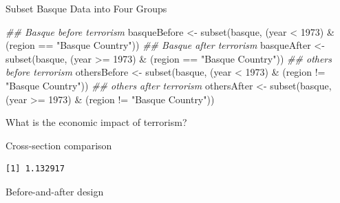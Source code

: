 \documentclass[
  letterpaper,
  DIV=11,
  numbers=noendperiod]{scrreprt}
\newenvironment{Shaded}{\begin{snugshade}}{\end{snugshade}}
\newcommand{\DecValTok}[1]{\textcolor[rgb]{0.68,0.00,0.00}{#1}}
\newcommand{\DocumentationTok}[1]{\textcolor[rgb]{0.37,0.37,0.37}{\textit{#1}}}
\newcommand{\FunctionTok}[1]{\textcolor[rgb]{0.28,0.35,0.67}{#1}}
\newcommand{\NormalTok}[1]{\textcolor[rgb]{0.00,0.23,0.31}{#1}}
\newcommand{\OtherTok}[1]{\textcolor[rgb]{0.00,0.23,0.31}{#1}}
\newcommand{\SpecialCharTok}[1]{\textcolor[rgb]{0.37,0.37,0.37}{#1}}
\newcommand{\StringTok}[1]{\textcolor[rgb]{0.13,0.47,0.30}{#1}}
\begin{document}
Subset Basque Data into Four Groups

\begin{Shaded}
\begin{Highlighting}[]
\DocumentationTok{\#\# Basque before terrorism}
\NormalTok{basqueBefore }\OtherTok{\textless{}{-}} \FunctionTok{subset}\NormalTok{(basque, (year }\SpecialCharTok{\textless{}} \DecValTok{1973}\NormalTok{) }\SpecialCharTok{\&}
\NormalTok{                            (region }\SpecialCharTok{==} \StringTok{"Basque Country"}\NormalTok{))}
\DocumentationTok{\#\# Basque after terrorism}
\NormalTok{basqueAfter }\OtherTok{\textless{}{-}} \FunctionTok{subset}\NormalTok{(basque, (year }\SpecialCharTok{\textgreater{}=} \DecValTok{1973}\NormalTok{) }\SpecialCharTok{\&}
\NormalTok{                           (region }\SpecialCharTok{==} \StringTok{"Basque Country"}\NormalTok{))}
\DocumentationTok{\#\# others before terrorism}
\NormalTok{othersBefore }\OtherTok{\textless{}{-}} \FunctionTok{subset}\NormalTok{(basque, (year }\SpecialCharTok{\textless{}} \DecValTok{1973}\NormalTok{) }\SpecialCharTok{\&}
\NormalTok{                            (region }\SpecialCharTok{!=} \StringTok{"Basque Country"}\NormalTok{))}
\DocumentationTok{\#\# others after terrorism}
\NormalTok{othersAfter }\OtherTok{\textless{}{-}} \FunctionTok{subset}\NormalTok{(basque, (year }\SpecialCharTok{\textgreater{}=} \DecValTok{1973}\NormalTok{) }\SpecialCharTok{\&}
\NormalTok{                           (region }\SpecialCharTok{!=} \StringTok{"Basque Country"}\NormalTok{))}
\end{Highlighting}
\end{Shaded}

What is the economic impact of terrorism?

Cross-section comparison

\begin{Shaded}
\end{Shaded}

\begin{verbatim}
[1] 1.132917
\end{verbatim}

Before-and-after design

\begin{Shaded}
\end{Shaded}
\end{document}
